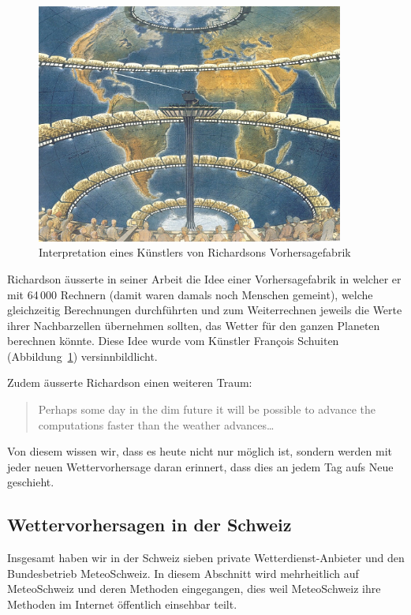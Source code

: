 \begin{refsection}
\begin{figure}
\centering
\includegraphics[width=0.9\textwidth]{klima/64000.jpg}
\caption{Interpretation eines Künstlers von Richardsons Vorhersagefabrik \cite{klima:biography}
\label{klima:geschichte:richardson}}
\end{figure}

Richardson äusserte in seiner Arbeit die Idee einer Vorhersagefabrik
in welcher er mit 64\,000 Rechnern (damit waren damals noch Menschen
gemeint), welche gleichzeitig Berechnungen durchführten und zum
Weiterrechnen jeweils die Werte ihrer Nachbarzellen übernehmen
sollten, das Wetter für den ganzen Planeten berechnen könnte. Diese
Idee wurde vom Künstler François Schuiten
(Abbildung~\ref{klima:geschichte:richardson}) versinnbildlicht.

Zudem äusserte Richardson einen weiteren Traum:
\begin{quote}
Perhaps some day in the dim future it will be possible to advance
the computations faster than the weather advances\dots
\end{quote}
Von diesem wissen wir, dass es heute nicht nur möglich ist, sondern
werden mit jeder neuen Wettervorhersage daran erinnert, dass dies
an jedem Tag aufs Neue geschieht.

\subsection{Wettervorhersagen in der Schweiz
\label{klima:section:wettervorhersagen}}

Insgesamt haben wir in der Schweiz sieben private Wetterdienst-Anbieter
und den Bundesbetrieb MeteoSchweiz. In diesem Abschnitt wird
mehrheitlich auf MeteoSchweiz
%
und deren Methoden
eingegangen, dies weil MeteoSchweiz ihre Methoden im Internet
öffentlich einsehbar teilt.


\end{refsection}
